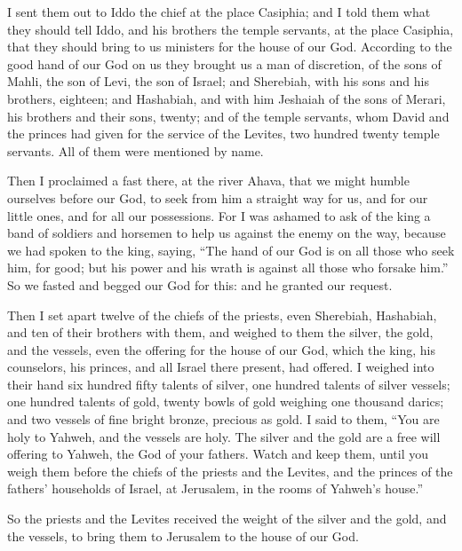 {I sent them out to Iddo the chief at the place Casiphia; and I told them what they should tell Iddo, and his brothers the temple servants, at the place Casiphia, that they should bring to us ministers for the house of our God.
According to the good hand of our God on us they brought us a man of discretion, of the sons of Mahli, the son of Levi, the son of Israel; and Sherebiah, with his sons and his brothers, eighteen;
and Hashabiah, and with him Jeshaiah of the sons of Merari, his brothers and their sons, twenty;
and of the temple servants, whom David and the princes had given for the service of the Levites, two hundred twenty temple servants. All of them were mentioned by name.
\par }{\PP {}Then I proclaimed a fast there, at the river Ahava, that we might humble ourselves before our God, to seek from him a straight way for us, and for our little ones, and for all our possessions.
For I was ashamed to ask of the king a band of soldiers and horsemen to help us against the enemy on the way, because we had spoken to the king, saying, “The hand of our God is on all those who seek him, for good; but his power and his wrath is against all those who forsake him.”
So we fasted and begged our God for this: and he granted our request.
\par }{\PP {}Then I set apart twelve of the chiefs of the priests, even Sherebiah, Hashabiah, and ten of their brothers with them,
and weighed to them the silver, the gold, and the vessels, even the offering for the house of our God, which the king, his counselors, his princes, and all Israel there present, had offered.
I weighed into their hand six hundred fifty talents of silver, one hundred talents of silver vessels; one hundred talents of gold,
twenty bowls of gold weighing one thousand darics; and two vessels of fine bright bronze, precious as gold.
I said to them, “You are holy to Yahweh, and the vessels are holy. The silver and the gold are a free will offering to Yahweh, the God of your fathers.
Watch and keep them, until you weigh them before the chiefs of the priests and the Levites, and the princes of the fathers’ households of Israel, at Jerusalem, in the rooms of Yahweh’s house.”
\par }{\PP {}So the priests and the Levites received the weight of the silver and the gold, and the vessels, to bring them to Jerusalem to the house of our God.
}
